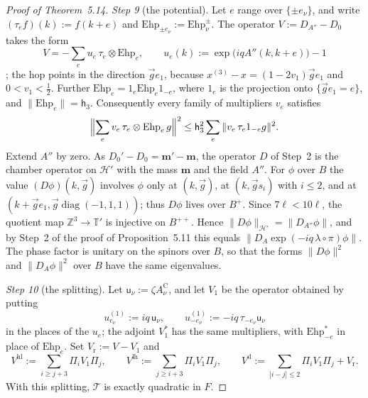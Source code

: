 \documentclass[11pt]{amsart}
\theoremstyle{definition}
\begin{document}
\begin{proof}[Proof of Theorem~5.14]
\emph{Step 9} (the potential).
Let $e$ range over $\{\pm e_\nu\}$, and write $(\tau_ef)(k):=f(k+e)$ and $\mathrm{Ehp}_{\pm e_\nu}:=\mathrm{Ehp}^\pm_\nu$.
The operator $V:=D_{A''}-D_0$ takes the form
\begin{equation*}
V=-\sum_eu_e\,\tau_e\otimes\mathrm{Ehp}_e,\qquad u_e(k):=\exp\bigl(iqA''(k,k+e)\bigr)-1
\end{equation*}
\cite[Definition~2.10]{QEDII};
the hop points in the direction $\vec ge_1$, because $x^{(3)}-x=(1-2v_1)\vec ge_1$ and $0<v_1<\frac12$.
Further $\mathrm{Ehp}_e=1_e\mathrm{Ehp}_e1_{-e}$, where $1_e$ is the projection onto $\{\vec ge_1=e\}$, and $\|\mathrm{Ehp}_e\|=\mathsf h_3$.
Consequently every family of multipliers $v_e$ satisfies
\begin{equation*}
\Bigl\|\sum_ev_e\,\tau_e\otimes\mathrm{Ehp}_e\,g\Bigr\|^2\le\mathsf h_3^2\sum_e\|v_e\,\tau_e1_{-e}g\|^2.
\end{equation*}
Extend $A''$ by zero.
As $D_0'-D_0=\mathbf m'-\mathbf m$, the operator $D$ of Step~2 is the chamber operator on $\mathcal H'$ with the mass $\mathbf m$ and the field $A''$.
For $\phi$ over $B$ the value $(D\phi)(k,\vec g)$ involves $\phi$ only at $(k,\vec g)$, at $(k,\vec gs_i)$ with $i\le2$, and at $(k+\vec ge_1,\vec g\operatorname{diag}(-1,1,1))$;
thus $D\phi$ lives over $B^+$.
Since $7\ell<10\ell$, the quotient map $\mathbb Z^3\to\mathbb T'$ is injective on $B^{++}$.
Hence $\|D\phi\|_{\mathcal H'}=\|D_{A''}\phi\|$, and by Step~2 of the proof of Proposition~5.11 this equals $\|D_A\exp(-iq\,\lambda\circ\pi)\phi\|$.
The phase factor is unitary on the spinors over $B$, so that the forms $\|D\phi\|^2$ and $\|D_A\phi\|^2$ over $B$ have the same eigenvalues.

\emph{Step 10} (the splitting).
Let $\mathsf u_\nu:=\zeta A^{\mathrm C}_\nu$, and let $V_1$ be the operator obtained by putting
\begin{equation*}
u^{(1)}_{e_\nu}:=iq\,\mathsf u_\nu,\qquad u^{(1)}_{-e_\nu}:=-iq\,\tau_{-e_\nu}\mathsf u_\nu
\end{equation*}
in the places of the $u_e$;
the adjoint $V_1^*$ has the same multipliers, with $\mathrm{Ehp}_{-e}^*$ in place of $\mathrm{Ehp}_e$.
Set $V_{\mathrm r}:=V-V_1$ and
\begin{equation*}
V^{\mathrm{hl}}:=\sum_{i\ge j+3}\Pi_iV_1\Pi_j,\qquad V^{\mathrm{lh}}:=\sum_{j\ge i+3}\Pi_iV_1\Pi_j,\qquad V^{\mathrm d}:=\sum_{|i-j|\le2}\Pi_iV_1\Pi_j+V_{\mathrm r}.
\end{equation*}
With this splitting, $\mathcal T$ is exactly quadratic in $F$.


\end{proof}
\end{document}
